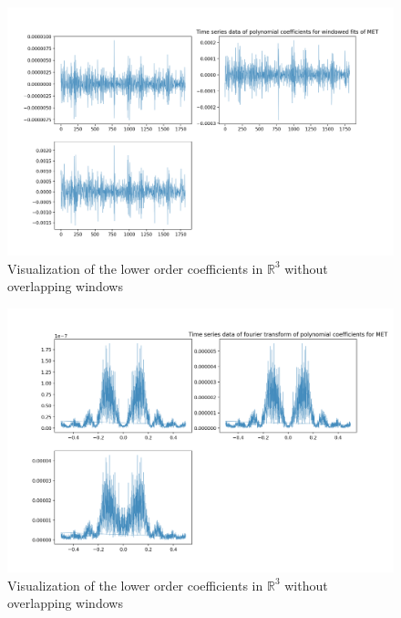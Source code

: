 \documentclass[final]{article}
\begin{document}
\begin{figure}[H]
  \centering
  \includegraphics[width=\linewidth]{img/fourier1}
  \caption{Visualization of the lower order coefficients in $\mathbb{R}^3$
  without overlapping windows}
  \label{fig:coeff}
\end{figure}

\begin{figure}[H]
  \centering
  \includegraphics[width=\linewidth]{img/fourier2}
  \caption{Visualization of the lower order coefficients in $\mathbb{R}^3$
  without overlapping windows}
  \label{fig:coeff}
\end{figure}
\end{document}
